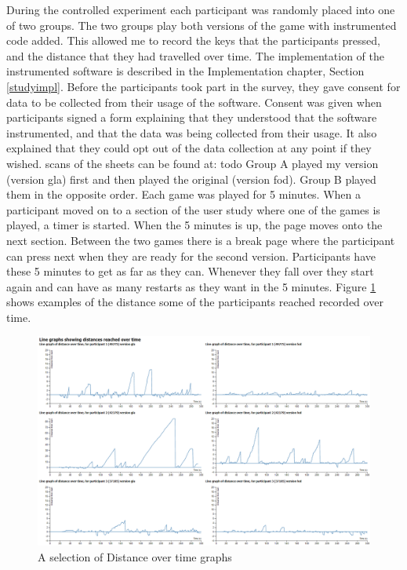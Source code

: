 \documentclass[12pt,a4paper,twoside,openright]{report}
\begin{document}
During the controlled experiment each participant was randomly placed into one of two groups.
The two groups play both versions of the game with instrumented code added. This allowed me to record the keys that the participants pressed, and the distance that they had travelled over time. The implementation of the instrumented software is described in the Implementation chapter, Section \ref{studyimpl}.
Before the participants took part in the survey, they gave consent for data to be collected from their usage of the software. Consent was given when participants signed a form explaining that they understood that the software instrumented, and that the data was being collected from their usage. It also explained that they could opt out of the data collection at any point if they wished. scans of the sheets can be found at: todo
Group A played my version (version gla) first and then played the original (version fod). Group B played them in the opposite order.
Each game was played for 5 minutes. When a participant moved on to a section of the user study where one of the games is played, a timer is started. When the 5 minutes is up, the page moves onto the next section. Between the two games there is a break page where the participant can press next when they are ready for the second version.
Participants have these 5 minutes to get as far as they can. Whenever they fall over they start again and can have as many restarts as they want in the 5 minutes. Figure \ref{assorted} shows examples of the distance some of the participants reached recorded over time.
\begin{figure}[tbh]
\centerline{\includegraphics[scale=0.39]{assortedLineGraphs.PNG}}
\caption{A selection of Distance over time graphs}
\label{assorted}
\end{figure}
\end{document}
